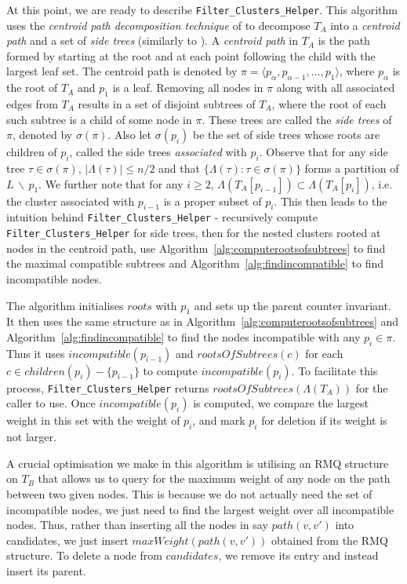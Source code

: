 \documentclass{article}
\newcommand{\leafset}{\Lambda}
\begin{document}
    At this point, we are ready to describe \texttt{Filter\_Clusters\_Helper}. This algorithm uses the \textit{centroid path decomposition technique} of \cite{cole2000n} to decompose $T_A$ into a \textit{centroid path} and a set of \textit{side trees} (similarly to \cite{jansson2018algorithms}). A \textit{centroid path} in $T_A$ is the path formed by starting at the root and at each point following the child with the largest leaf set. The centroid path is denoted by $\pi = \langle p_{\alpha}, p_{\alpha - 1}, ..., p_1 \rangle$, where $p_{\alpha}$ is the root of $T_A$ and $p_1$ is a leaf. Removing all nodes in $\pi$ along with all associated edges from $T_A$ results in a set of disjoint subtrees of $T_A$, where the root of each such subtree is a child of some node in $\pi$. These trees are called the \textit{side trees} of $\pi$, denoted by $\sigma(\pi)$. Also let $\sigma(p_i)$ be the set of side trees whose roots are children of $p_i$, called the side trees \textit{associated} with $p_i$. Observe that for any side tree $\tau \in \sigma(\pi)$, $|\leafset(\tau)| \leq n/2$ and that $\{\leafset(\tau) : \tau \in \sigma(\pi)\}$ forms a partition of $L\, \backslash\, {p_1}$. We further note that for any $i \geq 2$, $\leafset(T_A[p_{i - 1}]) \subset \leafset(T_A[p_i])$, i.e. the cluster associated with $p_{i-1}$ is a proper subset of $p_i$. This then leads to the intuition behind \texttt{Filter\_Clusters\_Helper} - recursively compute \texttt{Filter\_Clusters\_Helper} for side trees, then for the nested clusters rooted at nodes in the centroid path, use Algorithm~\ref{alg:computerootsofsubtrees} to find the maximal compatible subtrees and Algorithm~\ref{alg:findincompatible} to find incompatible nodes.

    The algorithm initialises $roots$ with $p_1$ and sets up the parent counter invariant. It then uses the same structure as in Algorithm~\ref{alg:computerootsofsubtrees} and Algorithm~\ref{alg:findincompatible} to find the nodes incompatible with any $p_i \in \pi$. Thus it uses $incompatible(p_{i-1})$ and $rootsOfSubtrees(c)$ for each $c \in children(p_i) - \{p_{i-1}\}$ to compute $incompatible(p_i)$. To facilitate this process, \texttt{Filter\_Clusters\_Helper} returns $rootsOfSubtrees(\leafset(T_A))$ for the caller to use. Once $incompatible(p_i)$ is computed, we compare the largest weight in this set with the weight of $p_i$, and mark $p_i$ for deletion if its weight is not larger.

    A crucial optimisation we make in this algorithm is utilising an RMQ structure on $T_B$ that allows us to query for the maximum weight of any node on the path between two given nodes. This is because we do not actually need the set of incompatible nodes, we just need to find the largest weight over all incompatible nodes. Thus, rather than inserting all the nodes in say $path(v, v')$ into candidates, we just insert $maxWeight(path(v, v'))$ obtained from the RMQ structure. To delete a node from $candidates$, we remove its entry and instead insert its parent.
\end{document}
